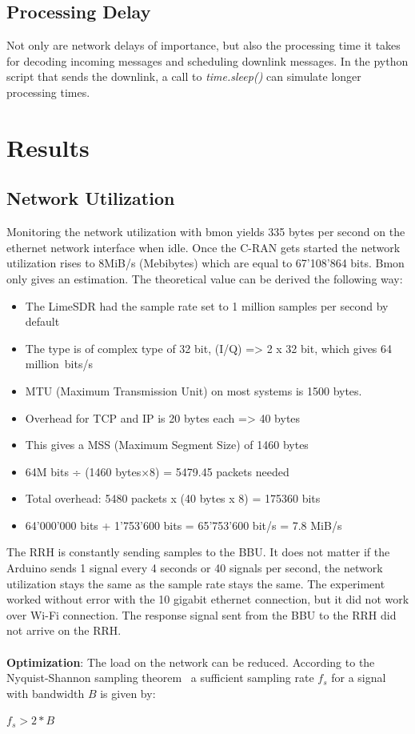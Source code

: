 \subsection{Processing Delay}
Not only are network delays of importance, but also the processing time it takes for decoding incoming messages and scheduling downlink messages.
In the python script that sends the downlink, a call to \emph{time.sleep()} can simulate longer processing times.


\section{Results}
\subsection{Network Utilization}
Monitoring the network utilization with bmon yields 
335 bytes per second on the ethernet network interface when idle. Once the C-RAN gets started the network
utilization rises to 8MiB/s (Mebibytes) which are equal to 67’108’864 bits.
Bmon only gives an estimation. The theoretical value can be derived the following way:
\\
\begin{itemize}
    \item The LimeSDR had the sample rate set to 1 million samples per second by default
    \item The type is of complex type of 32 bit, (I/Q) => 2 x 32 bit, which gives 64 million~bits/s
    \item MTU (Maximum Transmission Unit) on most systems is 1500 bytes.
    \item Overhead for TCP and IP is 20 bytes each => 40 bytes
    \item This gives a MSS (Maximum Segment Size) of 1460 bytes
    \item 64M bits ÷ (1460 bytes×8) = 5479.45 packets needed
    \item Total overhead: 5480 packets x (40 bytes x 8) = 175360 bits
    \item 64’000’000 bits + 1’753’600 bits = 65’753’600 bit/s = 7.8 MiB/s
\end{itemize}

The RRH is constantly sending samples to the BBU. It does not matter if the Arduino 
sends 1 signal every 4 seconds or 40 signals per second, the network utilization stays the same
as the sample rate stays the same. The experiment worked without error with the 
10 gigabit ethernet connection, but it did not work over Wi-Fi connection.
The response signal sent from the BBU to the RRH did not arrive on the RRH.
\\
\\
\textbf{Optimization}: The load on the network can be reduced. According to the Nyquist-Shannon sampling theorem~\cite{Shannon1949}
a sufficient sampling rate $f_{s}$ for a signal with bandwidth $B$ is given by:
\begin{center}
    $f_{s} > 2*B$  
\end{center}

